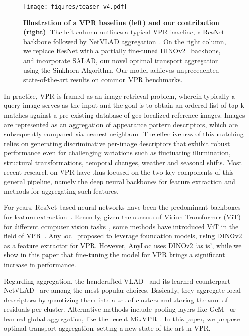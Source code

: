\documentclass[10pt,twocolumn,letterpaper]{article}
\begin{document}
\begin{figure}[t!]
  \centering
   \texttt{[image: figures/teaser\_v4.pdf]}
    \caption{\textbf{Illustration of a VPR baseline (left) and our contribution (right).} The left column outlines a typical VPR baseline, a ResNet backbone followed by NetVLAD aggregation~\cite{arandjelovic2016netvlad}. On the right column, we replace ResNet with a partially fine-tuned DINOv2~\cite{oquab2023dinov2} backbone, and incorporate SALAD, our novel optimal transport aggregation using the Sinkhorn Algorithm. Our model achieves unprecedented state-of-the-art results on common VPR benchmarks.}
   \label{fig:teaser}
\end{figure}\vspace{0.5em}

In practice, VPR is framed as an image retrieval problem, wherein typically a query image serves as the input and the goal is to obtain an ordered list of top-k matches against a pre-existing database of geo-localized reference images.
Images are represented as an aggregation of appearance pattern descriptors, which are subsequently compared via nearest neighbour.
The effectiveness of this matching relies on generating discriminative per-image descriptors that exhibit robust performance even for challenging variations such as fluctuating illumination, structural transformations, temporal changes, weather and seasonal shifts.
Most recent research on VPR have thus focused on the two key components of this general pipeline, namely the deep neural backbones for feature extraction and methods for aggregating such features.

For years, ResNet-based neural networks have been the predominant backbones for feature extraction~\cite{arandjelovic2016netvlad,radenovic2018fine,hausler2021patch}. Recently, given the success of Vision Transformer (ViT) for different computer vision tasks~\cite{dosovitskiy2020image,han2022survey,lee2022mpvit,liu2022swin}, some methods have introduced ViT in the field of VPR~\cite{wang2022transvpr, zhu2023r2former}. AnyLoc~\cite{keetha2023anyloc} proposed to leverage foundation models, using DINOv2~\cite{oquab2023dinov2} as a feature extractor for VPR. However, AnyLoc uses DINOv2 `as is', while we show in this paper that fine-tuning the model for VPR brings a significant increase in performance.

Regarding aggregation, the handcrafted VLAD~\cite{jegou2010aggregating} and its learned counterpart NetVLAD~\cite{arandjelovic2016netvlad} are among the most popular choices. Basically, they aggregate local descriptors by quantizing them into a set of clusters and storing the sum of residuals per cluster.
Alternative methods include pooling layers like GeM~\cite{radenovic2018fine} or learned global aggregation, like the recent MixVPR~\cite{ali2023mixvpr}. In this paper, we propose optimal transport aggregation, setting a new state of the art in VPR.
\end{document}
